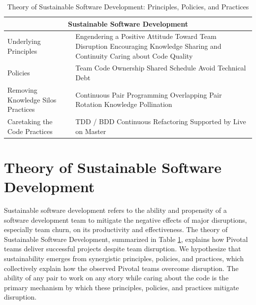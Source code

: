 \begin{table}[t]
\renewcommand{\arraystretch}{1.5}
\centering
\caption{Theory of Sustainable Software Development: Principles, Policies, and Practices}
\label{SustainableSoftwareDevelopmentTable}
\begin{tabular}{|p{2.5in}|p{3.5in}|}
\hline
\multicolumn{2}{|c|}{Sustainable Software Development}              
\\
\hline
Underlying Principles & Engendering a Positive Attitude Toward Team Disruption \newline Encouraging Knowledge Sharing and Continuity \newline Caring about Code Quality \\ 
\hline
Policies & Team Code Ownership \newline Shared Schedule \newline Avoid Technical Debt  \\
\hline
Removing Knowledge Silos Practices & Continuous Pair Programming \newline Overlapping Pair Rotation \newline  Knowledge Pollination  \\
\hline
Caretaking the Code Practices & TDD / BDD \newline Continuous Refactoring  \newline Supported by Live on Master \\
\hline
\end{tabular}
\end{table}


\section{Theory of Sustainable Software Development}
\label{SustainableSoftwareDevelopmentTheory}

Sustainable software development refers to the ability and propensity of a software development team to mitigate the negative effects of major disruptions, especially team churn, on its productivity and effectiveness. The theory of Sustainable Software Development, summarized in Table \ref{SustainableSoftwareDevelopmentTable}, explains how Pivotal teams deliver successful projects despite team disruption. We hypothesize that sustainability emerges from synergistic principles, policies, and practices, which collectively explain how the observed Pivotal teams overcome disruption. The ability of any pair to work on any story while caring about the code is the primary mechanism by which these principles, policies, and practices mitigate disruption. 

